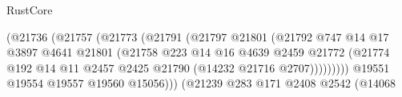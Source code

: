 \begin{lexlean}{RustCore}
\begin{coremodule}
                                                    (@21736
                                                      (@21757
                                                        (@21773
                                                          (@21791
                                                            (@21797
                                                              @21801
                                                              (@21792
                                                                @747
                                                                @14
                                                                @17
                                                                @3897
                                                                @4641
                                                                @21801
                                                                (@21758
                                                                  @223
                                                                  @14
                                                                  @16
                                                                  @4639
                                                                  @2459
                                                                  @21772
                                                                  (@21774
                                                                    @192
                                                                    @14
                                                                    @11
                                                                    @2457
                                                                    @2425
                                                                    @21790
                                                                    (@14232 @21716 @2707)))))))))
                                                    @19551
                                                    @19554
                                                    @19557
                                                    @19560
                                                    @15056)))
                                              (@21239
                                                @283
                                                @171
                                                @2408
                                                @2542
                                                (@14068

\end{coremodule}
\end{lexlean}
